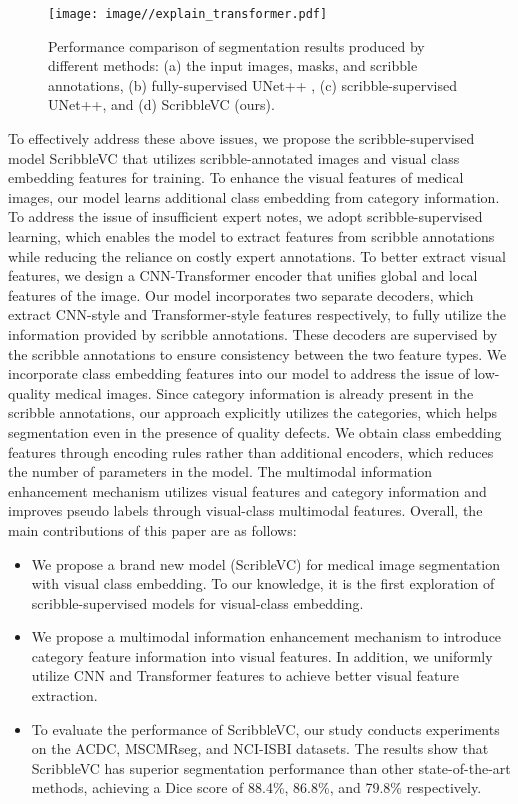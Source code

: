 \documentclass[sigconf,natbib=false]{acmart}
\begin{document}
\begin{figure}[ht]
\setlength{\abovecaptionskip}{1mm}
  \centering
  \texttt{[image: image//explain\_transformer.pdf]}
  \caption{Performance comparison of segmentation results produced by different methods: (a) the input images, masks, and scribble annotations, (b) fully-supervised UNet++ \cite{unet++},  (c) scribble-supervised UNet++, and (d) ScribbleVC (ours).}
  \label{comparison}
  \vspace{-6mm}
\end{figure}
To effectively address these above issues, we propose the scribble-supervised model ScribbleVC that utilizes scribble-annotated images and visual class embedding features for training. To enhance the visual features of medical images, our model learns additional class embedding from category information. To address the issue of insufficient expert notes, we adopt scribble-supervised learning, which enables the model to extract features from scribble annotations while reducing the reliance on costly expert annotations. To better extract visual features, we design a CNN-Transformer encoder that unifies global and local features of the image. Our model incorporates two separate decoders, which extract CNN-style and Transformer-style features respectively, to fully utilize the information provided by scribble annotations. These decoders are supervised by the scribble annotations to ensure consistency between the two feature types. We incorporate class embedding features into our model to address the issue of low-quality medical images. Since category information is already present in the scribble annotations, our approach explicitly utilizes the categories, which helps segmentation even in the presence of quality defects. We obtain class embedding features through encoding rules rather than additional encoders, which reduces the number of parameters in the model. The multimodal information enhancement mechanism utilizes visual features and category information and improves pseudo labels through visual-class multimodal features. Overall, the main contributions of this paper are as follows:
 
\begin{itemize}
    \item We propose a brand new model (ScribleVC) for medical image segmentation with visual class embedding. To our knowledge, it is the first exploration of scribble-supervised models for visual-class embedding.
    \item We propose a multimodal information enhancement mechanism to introduce category feature information into visual features. In addition, we uniformly utilize CNN and Transformer features to achieve better visual feature extraction.
    \item To evaluate the performance of ScribbleVC, our study conducts experiments on the ACDC, MSCMRseg, and NCI-ISBI datasets. The results show that ScribbleVC has superior segmentation performance than other state-of-the-art methods, achieving a Dice score of 88.4\%, 86.8\%, and 79.8\% respectively.
\end{itemize}
\end{document}
